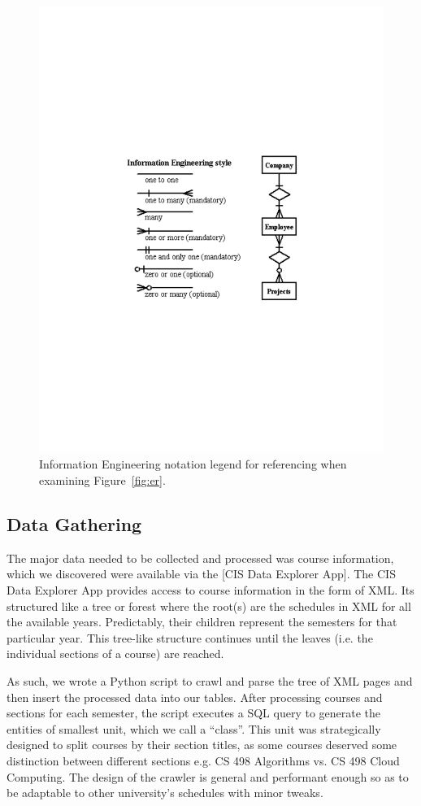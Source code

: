 \documentclass{article}
\begin{document}
        \begin{figure}[h]
            \centering
            \includegraphics[width=.7\textwidth]{figures/er-legend.pdf}
            \caption{Information Engineering notation legend for referencing
            when examining Figure~\ref{fig:er}.} 
        \end{figure}

        \subsection[Data Gather]{Data Gathering}
        The major data needed to be collected and processed was course
        information, which we discovered were available via the
        \href{http://courses.illinois.edu/cisdocs/explorer}[CIS Data Explorer App].
        The CIS Data Explorer App provides access to course information in the
        form of XML. Its structured like a tree or forest where the root(s) are
        the schedules in XML for all the available years. Predictably, their
        children represent the semesters for that particular year. This tree-like
        structure continues until the leaves (i.e. the individual sections of a
        course) are reached.

        As such, we wrote a Python script to crawl and parse the tree of XML pages
        and then insert the processed data into our tables. After processing courses and
        sections for each semester, the script executes a SQL query to
        generate the entities of smallest unit, which we call a ``class''. This
        unit was strategically designed to split courses by their section titles,
        as some courses deserved some distinction between different sections e.g.
        CS 498 Algorithms vs. CS 498 Cloud Computing. The design of the crawler
        is general and performant enough so as to be adaptable to other university's
        schedules with minor tweaks.
\end{document}
